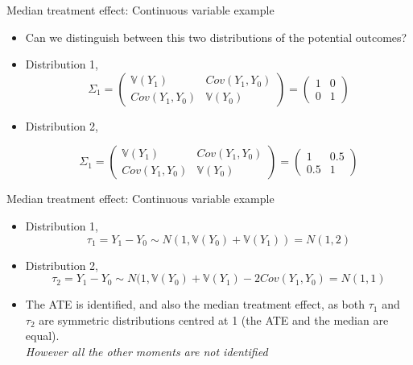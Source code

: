 \documentclass[handout]{beamer}
\theoremstyle{definition}
\begin{document}
\begin{frame}{Median treatment effect: Continuous variable example}
\begin{itemize}
\item <+->  Can we distinguish between this two distributions of the potential outcomes? 

\item<+->  Distribution 1, 
\[ \Sigma_1 = \left( \begin{array}{cc}
 \mathbb{V}(Y_1) & Cov(Y_1,Y_0) \\
 Cov(Y_1,Y_0) & \mathbb{V}(Y_0)
\end{array} \right) 
= \left( \begin{array}{cc}
 1 & 0 \\
 0 & 1
\end{array} \right) \] 

\item<+->  Distribution 2,

\[ \Sigma_1 = \left( \begin{array}{cc}
 \mathbb{V}(Y_1) & Cov(Y_1,Y_0) \\
 Cov(Y_1,Y_0) & \mathbb{V}(Y_0)
\end{array} \right) 
= \left( \begin{array}{cc}
 1 & 0.5 \\
 0.5 & 1
\end{array} \right) \] 
\end{itemize}
\end{frame}


\begin{frame}{Median treatment effect: Continuous variable example}
\begin{itemize}
\item<+-> Distribution 1, 
\[ \tau_1 = Y_1 - Y_0 \sim N(1,\mathbb{V}(Y_0)+\mathbb{V}(Y_1)) = N(1,2) \]

\item<+->  Distribution 2, 
\[ \tau_2 = Y_1 - Y_0 \sim N(1,\mathbb{V}(Y_0)+\mathbb{V}(Y_1)-2 Cov(Y_1,Y_0) = N(1,1) \]

\item<+->  The ATE is identified, and also the median treatment effect, as both $\tau_1$ and $\tau_2$ are symmetric distributions centred at 1 (the ATE and the median are equal). \\
\textit{However all the other moments are not identified} 
\end{itemize}
\end{frame}

\end{document}
